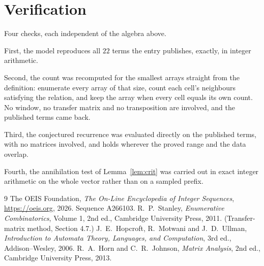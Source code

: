 \documentclass[11pt,a4paper]{article}
\theoremstyle{plain}
\theoremstyle{definition}
\begin{document}
\section{Verification}

Four checks, each independent of the algebra above.

First, the model reproduces all $22$ terms the entry publishes, exactly, in integer
arithmetic.

Second, the count was recomputed for the smallest arrays straight from the definition:
enumerate every array of that size, count each cell's neighbours satisfying the relation, and
keep the array when every cell equals its own count. No window, no transfer matrix and no
transposition are involved, and the published terms came back.

Third, the conjectured recurrence was evaluated directly on the published terms, with no
matrices involved, and holds wherever the proved range and the data overlap.

Fourth, the annihilation test of Lemma~\ref{lem:crit} was carried out in exact integer
arithmetic on the whole vector rather than on a sampled prefix.

\begin{thebibliography}{9}
 The OEIS Foundation, \emph{The On-Line Encyclopedia of Integer
Sequences}, \url{https://oeis.org}, 2026. Sequence A266103.
 R.~P.~Stanley, \emph{Enumerative Combinatorics}, Volume 1, 2nd ed.,
Cambridge University Press, 2011. (Transfer-matrix method, Section 4.7.)
 J.~E.~Hopcroft, R.~Motwani and J.~D.~Ullman, \emph{Introduction to Automata
Theory, Languages, and Computation}, 3rd ed., Addison--Wesley, 2006.
 R.~A.~Horn and C.~R.~Johnson, \emph{Matrix Analysis}, 2nd ed., Cambridge
University Press, 2013.
\end{thebibliography}
\end{document}
